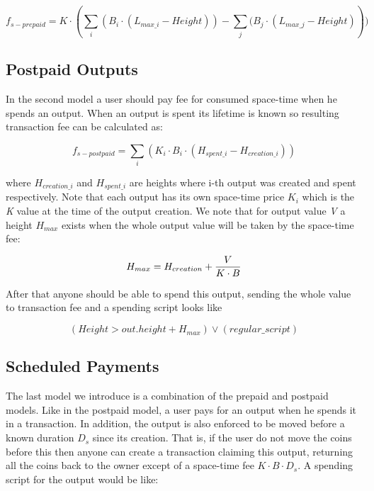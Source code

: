 \documentclass[]{llncs}   %
\newcommand{\authnote}[2]{\marginpar{\parbox{\marginparwidth}{\tiny %
  \textsf{#1 {\textcolor{blue}{notes: #2}}}}}%
  \textcolor{blue}{\textbf{\dag}}}
\newcommand{\authnote}[2]{
  \textsf{#1 \textcolor{blue}{: #2}}}
\newcommand{\authnote}[2]{}
\newcommand{\knote}[1]{{\authnote{\textcolor{green}{Alex notes}}{#1}}}
\newcommand{\dnote}[1]{{\authnote{\textcolor{red}{Dima notes}}{#1}}}
\begin{document}
\begin{equation}
f_{s-prepaid} = K \cdot (\sum_i{(B_i \cdot (L_{max\_i} - Height))} - \sum_j{(B_j \cdot (L_{max\_j} - Height)}))
\end{equation}

\knote{Height is subjective here, write about that}

\subsection{Postpaid Outputs}
\label{sec-postpaid}


In the second model a user should pay fee for consumed space-time when he spends an output. When an output is spent its lifetime is known so resulting transaction fee can be calculated as:

\begin{equation}
f_{s-postpaid} = \sum_i{(K_i \cdot B_i \cdot (H_{spent\_i} - H_{creation\_i}))}
\end{equation}

where $H_{creation\_i}$ and $H_{spent\_i}$ are heights where i-th output was created and spent respectively. Note that each output has its own space-time price \textit{$K_i$} which is the \textit{K} value at the time of the output creation. We note that for output value \textit{V} a height \textit{$H_{max}$} exists when the whole output value will be taken by the space-time fee:

\begin{equation}
H_{max} = {H_{creation} + {V \over {K \cdot B}}}
\end{equation}

After that anyone should be able to spend this output, sending the whole value to transaction fee and a spending script looks like

\begin{equation}
(Height > out.height + H_{max}) \lor (regular\_script)
\end{equation}
\dnote{TODO: space-time fee may be enforced by a script)}

\subsection{Scheduled Payments}
\label{sec-scheduled}

The last model we introduce is a combination of the prepaid and postpaid models. Like in the postpaid model, a user pays for an output when he spends it in a transaction. In addition, the output is also enforced to be moved before a known duration $D_{s}$ since its creation. That is, if the user do not move the coins before this then anyone can create a transaction claiming this output, returning all the coins back to the owner except of a space-time fee ${K \cdot B \cdot D_{s}}$. A spending script for the output would be like:
\end{document}
